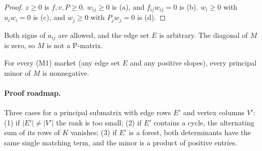 \begin{proof}
$z\ge0$ is $f,v,P\ge0$. $w_{ij}\ge0$ is (a), and $f_{ij}w_{ij}=0$ is (b). $w_i\ge0$ with $u_iw_i=0$ is
(c), and $w_j\ge0$ with $P_jw_j=0$ is (d).
\end{proof}

Both signs of $a_{ij}$ are allowed, and the edge set $E$ is arbitrary. The diagonal of $M$ is zero, so
$M$ is not a P-matrix.

\begin{lemma}[$P_0$]\label{plcp:lem:p0}
For every (M1) market (any edge set $E$ and any positive slopes), every principal minor of $M$ is
nonnegative.
\end{lemma}

\paragraph{Proof roadmap.} Three cases for a principal submatrix with edge rows $E'$ and vertex columns
$V'$: (1) if $|E'|\ne|V'|$ the rank is too small; (2) if $E'$ contains a cycle, the alternating sum of
its rows of $K$ vanishes; (3) if $E'$ is a forest, both determinants have the same single matching term,
and the minor is a product of positive entries.

